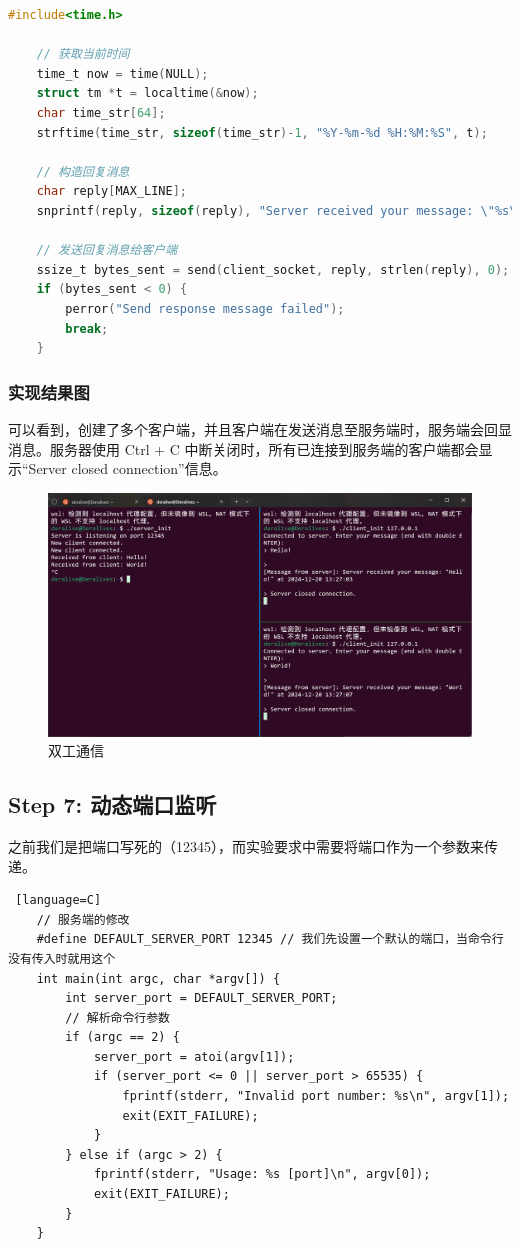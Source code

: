 \documentclass[14pt,a4paper,UTF8,twoside]{article}
\begin{document}
\begin{lstlisting}[language=C, title={Server Duplex}]
    #include<time.h>

    // 获取当前时间
    time_t now = time(NULL);
    struct tm *t = localtime(&now);
    char time_str[64];
    strftime(time_str, sizeof(time_str)-1, "%Y-%m-%d %H:%M:%S", t);

    // 构造回复消息
    char reply[MAX_LINE];
    snprintf(reply, sizeof(reply), "Server received your message: \"%s\" at %s\n", buffer, time_str);

    // 发送回复消息给客户端
    ssize_t bytes_sent = send(client_socket, reply, strlen(reply), 0);
    if (bytes_sent < 0) {
        perror("Send response message failed");
        break;
    }
\end{lstlisting}

\subsubsection*{实现结果图}

可以看到，创建了多个客户端，并且客户端在发送消息至服务端时，服务端会回显消息。服务器使用 Ctrl + C 中断关闭时，所有已连接到服务端的客户端都会显示“Server closed connection”信息。

\begin{figure}[H]
    \centering
    \includegraphics[width=0.7\linewidth]{lab7/fulldup.png}
    \caption{双工通信}
    \label{fig:fullduplex}
\end{figure}

\subsection{Step 7: 动态端口监听}

之前我们是把端口写死的（12345），而实验要求中需要将端口作为一个参数来传递。

\begin{lstlisting} [language=C]
    // 服务端的修改
    #define DEFAULT_SERVER_PORT 12345 // 我们先设置一个默认的端口，当命令行没有传入时就用这个
    int main(int argc, char *argv[]) {
        int server_port = DEFAULT_SERVER_PORT;
        // 解析命令行参数
        if (argc == 2) {
            server_port = atoi(argv[1]);
            if (server_port <= 0 || server_port > 65535) {
                fprintf(stderr, "Invalid port number: %s\n", argv[1]);
                exit(EXIT_FAILURE);
            }
        } else if (argc > 2) {
            fprintf(stderr, "Usage: %s [port]\n", argv[0]);
            exit(EXIT_FAILURE);
        }
    }
\end{lstlisting}
\end{document}
